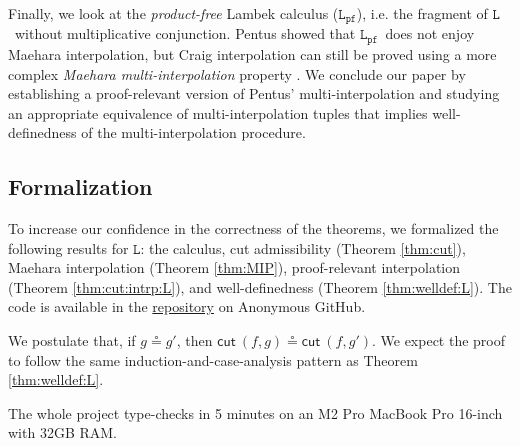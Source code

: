 \documentclass[a4paper,UKenglish,cleveref,autoref,thm-restate, anonymous]{lipics-v2021}
\newcommand{\mf}[1]{\mathsf{#1}}
\newcommand{\MIP}{\textsf{MIP}}
\newcommand{\MmIP}{\textsf{MmIP}}
\renewcommand{\L}{$\mathtt{L}$}
\newcommand{\LPfree}{$\mathtt{L_{pf}}$}
\newcommand{\cut}{\mf{cut}}
\begin{document}
Finally, we look at the \emph{product-free} Lambek calculus (\LPfree), i.e. the fragment of \L\ without multiplicative conjunction.
Pentus showed that \LPfree\ does not enjoy Maehara interpolation, but Craig interpolation can still be proved using a more complex \emph{Maehara multi-interpolation} property \cite{Pentus1997}. We conclude our paper by establishing a proof-relevant version of Pentus' multi-interpolation and studying an appropriate equivalence of multi-interpolation tuples that implies well-definedness of the multi-interpolation procedure. 

\subsection*{Formalization}
To increase our confidence in the correctness of the theorems, we formalized the following results for \L: the calculus, cut admissibility (Theorem \ref{thm:cut}), Maehara interpolation (Theorem \ref{thm:MIP}), proof-relevant interpolation (Theorem \ref{thm:cut:intrp:L}), and well-definedness (Theorem \ref{thm:welldef:L}). The code is available in the \href{https://anonymous.4open.science/r/code-associative-Lambek/}{repository} on Anonymous GitHub.

We postulate that, if $g \circeq g'$, then $\cut\ (f,g) \circeq \cut\ (f,g')$. We expect the proof to follow the same induction-and-case-analysis pattern as Theorem \ref{thm:welldef:L}.

The whole project type-checks in 5 minutes on an M2 Pro MacBook Pro 16-inch with 32GB RAM.
\end{document}
